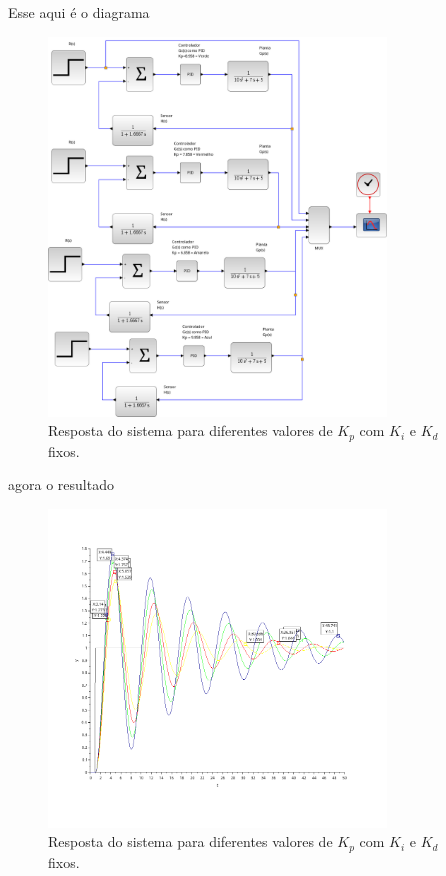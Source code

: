 Esse aqui é o diagrama
\begin{figure}[H]
    \centering
    \includegraphics[width=0.8\textwidth]{6-atividade/assets/diagrama-pid-ajustando-kp.png}
    \caption{Resposta do sistema para diferentes valores de \( K_p \) com \( K_i \) e \( K_d \) fixos.}
    \label{fig:diagrama-pid-ajustando-kp}
\end{figure}

agora o resultado
\begin{figure}[H]
    \centering
    \includegraphics[width=0.8\textwidth]{6-atividade/assets/pid-ajustando-kp.png}
    \caption{Resposta do sistema para diferentes valores de \( K_p \) com \( K_i \) e \( K_d \) fixos.}
    \label{fig:pid-ajustando-kp}
\end{figure}


